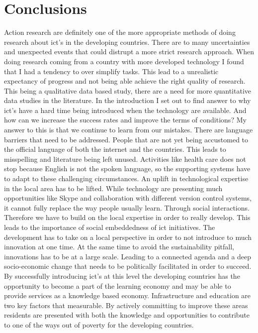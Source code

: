 \chapter{Conclusions}
Action research are definitely one of the more appropriate methods of doing research about \gls{ict}'s in the developing countries. 
There are to many uncertainties and unexpected events that could distrupt a more strict research approach.
When doing research coming from a country with more developed technology I found that I had a tendency to over simplify tasks.
This lead to a unrealistic expectancy of progress and not being able achieve the right quality of research.
This being a qualitative data based study, there are a need for more quantitative data studies in the literature.
In the introduction I set out to find answer to why \gls{ict}'s have a hard time being introduced when the technology are available.
And how can we increase the success rates and improve the terms of conditions?
My answer to this is that we continue to learn from our mistakes.
There are language barriers that need to be addressed. 
People that are not yet being accustomed to the official language of both the internet and the countries.
This leads to misspelling and literature being left unused. 
Activities like health care does not stop because English is not the spoken language, so the supporting systems have to adapt to these challenging circumstances.
An uplift in technological expertise in the local area has to be lifted. 
While technology are presenting much opportunities like Skype and collaboration with different version control systems, it cannot fully replace the way people usually learn. Through social interactions. 
Therefore we have to build on the local expertise in order to really develop. 
This leads to the importance of social embeddedness of \gls{ict} initiatives.
The development has to take on a local perspective in order to not introduce to much innovation at one time. 
At the same time to avoid the sustainability pitfall, innovations has to be at a large scale.
Leading to a connected agenda and a deep socio-economic change that needs to be politically facilitated in order to succeed.
By successfully introducing \gls{ict}'s at this level the developing countries has the opportunity to become a part of the learning economy and may be able to provide services as a knowledge based economy. 
Infrastructure and education are two key factors that measurable.
By actively committing to improve these areas residents are presented with both the knowledge and opportunities to contribute to one of the ways out of poverty for the developing countries. 



